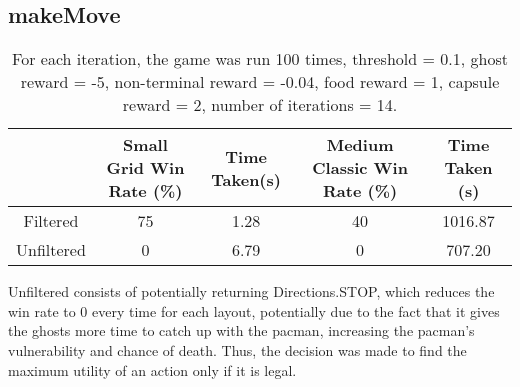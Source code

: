 \documentclass[12pt]{report}
\begin{document}
      \subsection*{makeMove}
        \begin{table}[H]
          \begin{center}
            \begin{adjustbox}{max width=\textwidth}
            \begin{tabular}{*{5}{c}}
              \textbf{} & \textbf{Small Grid Win Rate (\%)} & \textbf{Time Taken(s)} & \textbf{Medium Classic Win Rate (\%)} & \textbf{Time Taken (s)}\\
              \hline
                    Filtered & 75 & 1.28 & 40 & 1016.87\\
                    Unfiltered & 0 & 6.79 & 0 & 707.20\\
            \end{tabular}
            \end{adjustbox}
            \caption{For each iteration, the game was run 100 times, threshold = 0.1, ghost reward = -5, non-terminal reward = -0.04, food reward = 1, capsule reward = 2, number of iterations = 14.}
            \label{tab:table4}
          \end{center}
        \end{table}
        \vspace{-9mm}
        Unfiltered consists of potentially returning Directions.STOP, which reduces the win rate to 0 every time for each layout, potentially due to the fact that it gives the ghosts more time to catch up with the pacman, increasing the pacman's vulnerability and chance of death. Thus, the decision was made to find the maximum utility of an action only if it is legal.
\end{document}
